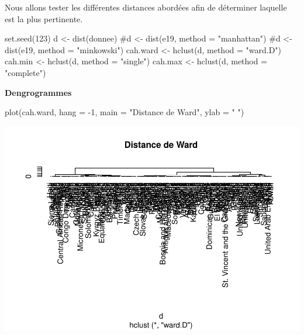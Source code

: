 \documentclass[
]{article}
\newenvironment{Shaded}{}{}
\newcommand{\AttributeTok}[1]{#1}
\newcommand{\CommentTok}[1]{\textcolor[rgb]{0.00,0.50,0.00}{#1}}
\newcommand{\DecValTok}[1]{#1}
\newcommand{\FunctionTok}[1]{#1}
\newcommand{\NormalTok}[1]{#1}
\newcommand{\OtherTok}[1]{\textcolor[rgb]{1.00,0.25,0.00}{#1}}
\newcommand{\SpecialCharTok}[1]{\textcolor[rgb]{0.00,0.50,0.50}{#1}}
\newcommand{\StringTok}[1]{\textcolor[rgb]{0.00,0.50,0.50}{#1}}
\begin{document}
Nous allons tester les différentes distances abordées afin de déterminer
laquelle est la plus pertinente.

\begin{Shaded}
\begin{Highlighting}[]
\FunctionTok{set.seed}\NormalTok{(}\DecValTok{123}\NormalTok{)}
\NormalTok{d }\OtherTok{\textless{}{-}} \FunctionTok{dist}\NormalTok{(donnee)}
\CommentTok{\#d \textless{}{-} dist(e19, method = "manhattan")}
\CommentTok{\#d \textless{}{-} dist(e19, method = "minkowski")}
\NormalTok{cah.ward }\OtherTok{\textless{}{-}} \FunctionTok{hclust}\NormalTok{(d, }\AttributeTok{method =} \StringTok{"ward.D"}\NormalTok{)}
\NormalTok{cah.min }\OtherTok{\textless{}{-}} \FunctionTok{hclust}\NormalTok{(d, }\AttributeTok{method =} \StringTok{"single"}\NormalTok{)}
\NormalTok{cah.max }\OtherTok{\textless{}{-}} \FunctionTok{hclust}\NormalTok{(d, }\AttributeTok{method =} \StringTok{"complete"}\NormalTok{)}
\end{Highlighting}
\end{Shaded}

\textbf{Dengrogrammes}

\begin{Shaded}
\begin{Highlighting}[]
\FunctionTok{plot}\NormalTok{(cah.ward, }\AttributeTok{hang =} \SpecialCharTok{{-}}\DecValTok{1}\NormalTok{, }\AttributeTok{main =} \StringTok{"Distance de Ward"}\NormalTok{, }\AttributeTok{ylab =} \StringTok{" "}\NormalTok{)}
\end{Highlighting}
\end{Shaded}

\includegraphics{Projet_files/figure-latex/unnamed-chunk-12-1.pdf}
\end{document}
